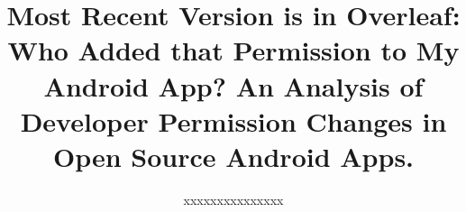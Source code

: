 \documentclass{sig-alternate-05-2015}
\newif\ifisnopii
\begin{document}
\title{Most Recent Version is in Overleaf: Who Added that Permission to My Android App? An Analysis of Developer Permission Changes in Open Source Android Apps.}


%
\ifisnopii %
\author{
%
\alignauthor
Daniel~E.~Krutz YASMINE~\&~Samuel~A.~Malachowsky\\ 	
	\affaddr{Software Engineering Department}\\
       \affaddr{Rochester Institute of Technology}\\
       \affaddr{1 Lomb Memorial Drive}\\
       \affaddr{Rochester, NY, USA} \\
       \email{\{dxkvse, samvse\}@rit.edu}
       \alignauthor
} %

\else %
\author{
%
\alignauthor
xxxxxxxxxxxxxxx\\ 	
	\\
       \\
        \\
       \alignauthor
} %
\fi %

\maketitle
\end{document}
